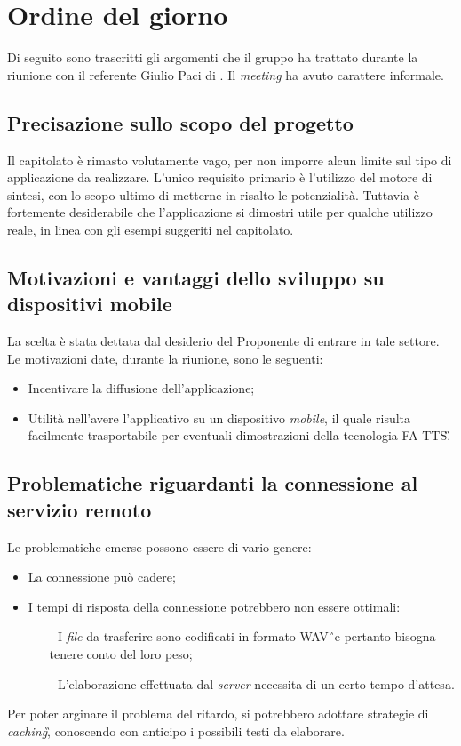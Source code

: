 \section{Ordine del giorno}
Di seguito sono trascritti gli argomenti che il gruppo ha trattato durante la 
riunione con il referente Giulio Paci di \AZIENDA. Il \textit{meeting} ha avuto carattere 
informale.

\subsection{Precisazione sullo scopo del progetto}
Il capitolato è rimasto volutamente vago, per non imporre alcun limite sul tipo 
di applicazione da realizzare. L'unico requisito primario è l'utilizzo del 
motore di sintesi, con lo scopo ultimo di metterne in risalto le potenzialità. 
Tuttavia è fortemente desiderabile che l'applicazione si dimostri utile per 
qualche utilizzo reale, in linea con gli esempi suggeriti nel capitolato.

\subsection{Motivazioni e vantaggi dello sviluppo su dispositivi mobile}
La scelta è stata dettata dal desiderio del Proponente di entrare in tale 
settore. Le motivazioni date, durante la riunione, sono le seguenti:
\begin{itemize}
	\item Incentivare la diffusione dell'applicazione;
	\item Utilità nell'avere l'applicativo su un dispositivo \textit{mobile}, 
	il quale risulta facilmente trasportabile per eventuali dimostrazioni della 
	tecnologia FA-TTS\G.
\end{itemize}

\subsection{Problematiche riguardanti la connessione al servizio remoto}
Le problematiche emerse possono essere di vario genere:
\begin{itemize}
\item La connessione può cadere;
\item I tempi di risposta della connessione potrebbero non essere ottimali:
\begin{itemize}
\item[-]I \textit{file} da trasferire sono codificati in formato WAV\G\ e pertanto 
bisogna tenere conto del loro peso;
\item[-]L'elaborazione effettuata dal \textit{server} necessita di un certo tempo 
d'attesa.
\end{itemize}
\end{itemize}
Per poter arginare il problema del ritardo, si potrebbero adottare strategie di 
\textit{caching}\G , conoscendo con anticipo i possibili testi da elaborare.


